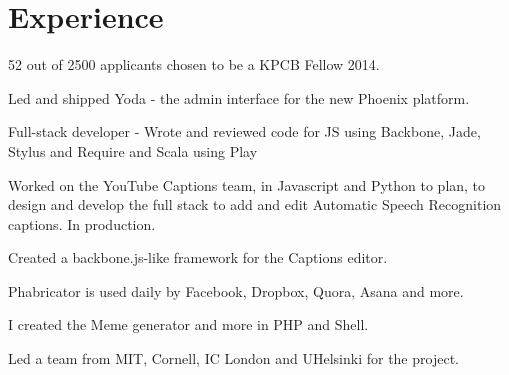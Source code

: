 \documentclass[]{deedy-resume-openfont}
\begin{document}
\hfill
\begin{minipage}[t]{0.66\textwidth}


\section{Experience}
\sectionsep

\vspace{\topsep} %
\begin{tightemize}
\item 52 out of 2500 applicants chosen to be a KPCB Fellow 2014.
\item Led and shipped Yoda - the admin interface for the new Phoenix platform.
\item Full-stack developer - Wrote and reviewed code for JS using Backbone, Jade, Stylus and Require and Scala using Play
\end{tightemize}
\sectionsep

\begin{tightemize}
\item Worked on the YouTube Captions team, in Javascript and Python to plan, to design and develop the full stack to add and edit Automatic Speech Recognition captions. In production.
\item Created a backbone.js-like framework for the Captions editor.
\end{tightemize}
\sectionsep

\begin{tightemize}
\item Phabricator is used daily by Facebook, Dropbox, Quora, Asana and more.
\item I created the Meme generator and more in PHP and Shell.
\item Led a team from MIT, Cornell, IC London and UHelsinki for the project.
\end{tightemize}
\sectionsep


\end{minipage}
\end{document}

